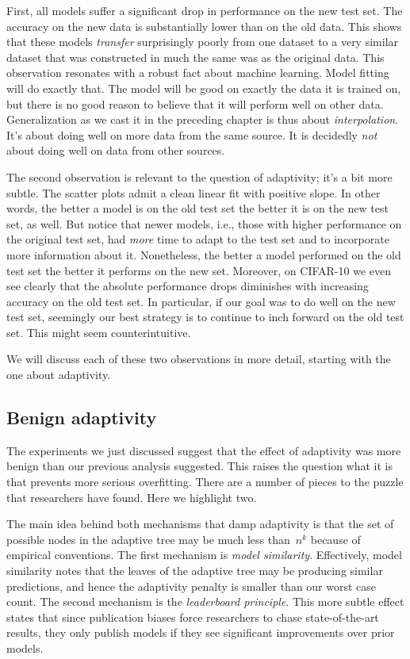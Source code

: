 \documentclass{tufte-book}
\begin{document}
First, all models suffer a significant drop in performance on the new
test set. The accuracy on the new data is substantially lower than on
the old data. This shows that these models \emph{transfer} surprisingly
poorly from one dataset to a very similar dataset that was constructed
in much the same was as the original data. This observation resonates
with a robust fact about machine learning. Model fitting will do exactly
that. The model will be good on exactly the data it is trained on, but
there is no good reason to believe that it will perform well on other
data. Generalization as we cast it in the preceding chapter is thus
about \emph{interpolation}. It's about doing well on more data from the
same source. It is decidedly \emph{not} about doing well on data from
other sources.

The second observation is relevant to the question of adaptivity; it's a
bit more subtle. The scatter plots admit a clean linear fit with
positive slope. In other words, the better a model is on the old test
set the better it is on the new test set, as well. But notice that newer
models, i.e., those with higher performance on the original test set,
had \emph{more} time to adapt to the test set and to incorporate more
information about it. Nonetheless, the better a model performed on the
old test set the better it performs on the new set. Moreover, on
CIFAR-10 we even see clearly that the absolute performance drops
diminishes with increasing accuracy on the old test set. In particular,
if our goal was to do well on the new test set, seemingly our best
strategy is to continue to inch forward on the old test set. This might
seem counterintuitive.

We will discuss each of these two observations in more detail, starting
with the one about adaptivity.

\hypertarget{benign-adaptivity}{%
\subsection{Benign adaptivity}\label{benign-adaptivity}}

The experiments we just discussed suggest that the effect of adaptivity
was more benign than our previous analysis suggested. This raises the
question what it is that prevents more serious overfitting. There are a
number of pieces to the puzzle that researchers have found. Here we
highlight two.

The main idea behind both mechanisms that damp adaptivity is that the
set of possible nodes in the adaptive tree may be much less than~\(n^k\)
because of empirical conventions. The first mechanism is \emph{model
similarity}. Effectively, model similarity notes that the leaves of the
adaptive tree may be producing similar predictions, and hence the
adaptivity penalty is smaller than our worst case count. The second
mechanism is the \emph{leaderboard principle}. This more subtle effect
states that since publication biases force researchers to chase
state-of-the-art results, they only publish models if they see
significant improvements over prior models.
\end{document}
